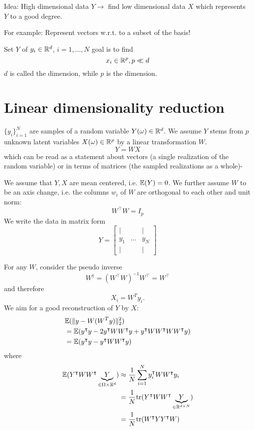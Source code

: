 \begin{aremark}
    Idea: High dimensional data $Y\to$ find low dimensional data $X$ which represents $Y$ to a good degree.

    For example: Represent vectors w.r.t. to a subset of the basis!
\end{aremark}

Set $Y$ of $y_i\in\mathbb{R}^d$, $i=1,\dots,N$
goal is to find 
\[x_i\in\mathbb{R}^p, p\ll d\]
$d$ is called the  dimension, while $p$ is the  dimension.

\section{Linear dimensionality reduction}

$\{y_i\}_{i=1}^N$ are samples of a random variable $Y(\omega)\in\mathbb{R}^d$.
We assume $Y$ stems from $p$ unknown latent variables $X(\omega)\in\mathbb{R}^p$ by a linear transformation $W$.
\[Y=WX\]
which can be read as a statement about vectors (a single realization of the random variable) or in terms of matrices (the sampled realizations as a whole)-

We assume that $Y,X$ are mean centered, i.e. $\mathbb{E}(Y)=0$. We further assume 
$W$ to be an axis change, i.e. the columns $w_i$ of $W$ are orthogonal to each other and unit norm:
\[W^\intercal W = I_p\]
We write the data in matrix form 
\[Y=\begin{bmatrix}
    \vert &&\vert\\
    y_1 & \dots & y_N\\
    \vert &&\vert
\end{bmatrix}\]

For any $W$, consider the pseudo inverse 
\[W^\dagger = (W^\intercal W)^{-1}W^\intercal=W^\intercal\]
and therefore 
\[X_i=W^T y_i.\]
We aim for a good reconstruction of $Y$ by $X$:
\begin{align*}
    &\mathbb{E}(\Vert y-W(W^T y)\Vert_2^2)\\
    &=\mathbb{E}(y^\intercal y-2y^\intercal W W^\intercal y+y^\intercal W W^\intercal W W^\intercal y)\\
    &=\mathbb{E}(y^\intercal y-y^\intercal WW^\intercal y)
\end{align*}
where 
\begin{align*}
    \mathbb{E}(Y^\intercal WW^\intercal \underbrace{Y}_{\in\Omega\times\mathbb{R}^d})&\approx\frac{1}{N}\sum_{i=1}^N y_i^\intercal W W^\intercal y_i\\
    &=\frac{1}{N}\text{tr}(Y^\intercal W W^\intercal \underbrace{Y}_{\in \mathbb{R}^{d\times N}})\\
    &=\frac{1}{N}\text{tr}(W^\intercal YY^\intercal W)
\end{align*}

